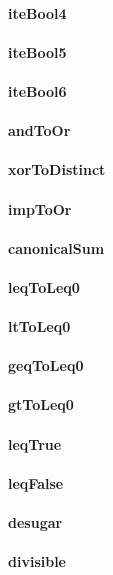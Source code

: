 \documentclass[a4paper]{article}
\begin{document}
\paragraph{iteBool4}
\paragraph{iteBool5}
\paragraph{iteBool6}
\paragraph{andToOr}
\paragraph{xorToDistinct}
\paragraph{impToOr}
\paragraph{canonicalSum}
\paragraph{leqToLeq0}
\paragraph{ltToLeq0}
\paragraph{geqToLeq0}
\paragraph{gtToLeq0}
\paragraph{leqTrue}
\paragraph{leqFalse}
\paragraph{desugar}
\paragraph{divisible}
\end{document}
